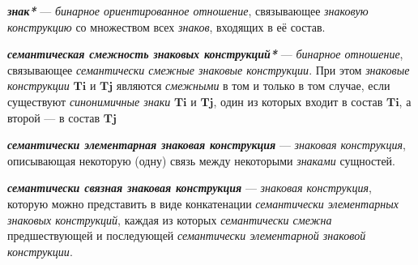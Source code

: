 \textbf{\textit{знак*}} --- \textit{бинарное ориентированное отношение}, связывающее \textit{знаковую конструкцию} со множеством всех \textit{знаков}, входящих в её состав.

\textbf{\textit{семантическая смежность знаковых конструкций*}} --- \textit{бинарное отношение}, связывающее \textit{семантически смежные знаковые конструкции}.
При этом \textit{знаковые конструкции} \textit{$\bm{Ti}$} и \textit{$\bm{Tj}$} являются \textit{смежными} в том и только в том случае, если существуют \textit{синонимичные знаки} \textit{$\bm{Ti}$} и \textit{$\bm{Tj}$}, один из которых входит в состав \textit{$\bm{Ti}$}, а второй --- в состав \textit{$\bm{Tj}$}

\begin{SCn}


\end{SCn}

\textbf{\textit{семантически элементарная знаковая конструкция}} --- \textit{знаковая конструкция}, описывающая некоторую (одну) связь между некоторыми \textit{знаками} сущностей.

\textbf{\textit{семантически связная знаковая конструкция}} --- \textit{знаковая конструкция}, которую можно представить в виде конкатенации \textit{семантически элементарных знаковых конструкций}, каждая из которых \textit{семантически смежна} предшествующей и последующей \textit{семантически элементарной знаковой конструкции}.

\begin{SCn}

    \begin{scnindent}
    \end{scnindent}
    \begin{scnindent}
    \end{scnindent}

\end{SCn}

